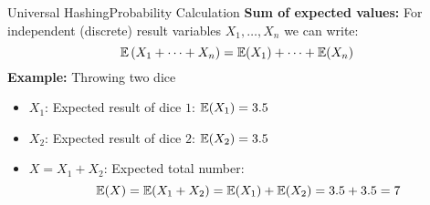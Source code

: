


\begin{frame}{Universal Hashing}{Probability Calculation}
   \textbf{Sum of expected values:}
   For independent (discrete) result variables {\color{MainA}$X_1,\dots,X_n$} we can write:
     {\color{MainA}\[\mathbb{E}\left(X_1+\dots+X_n\right)
       = \mathbb{E}(X_1) + \dots + \mathbb{E}(X_n)\]}
   \textbf{Example:} Throwing two dice
   \begin{itemize}
     \item<3->
       {\color{MainA}$X_1$}: Expected result of dice {\color{MainA}$1$}: {\color{MainA}$\mathbb{E}(X_1) = 3.5$}
     \item<4->
       {\color{MainA}$X_2$}: Expected result of dice {\color{MainA}$2$}: {\color{MainA}$\mathbb{E}(X_2) = 3.5$}
     \item<5->
       {\color{MainA}$X = X_1 + X_2$}: Expected total number:
       {\color{MainA}\[\mathbb{E}(X)
         = \mathbb{E}(X_1 + X_2)
         = \mathbb{E}(X_1) + \mathbb{E}(X_2) = 3.5 + 3.5 = 7\]}
   \end{itemize}
\end{frame}

